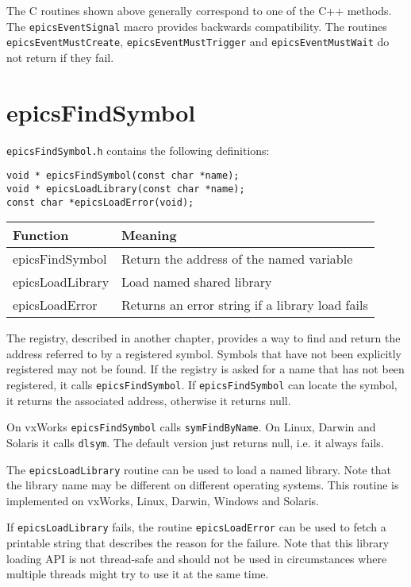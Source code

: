 The C routines shown above generally correspond to one of the C++ methods.
The \verb|epicsEventSignal| macro provides backwards compatibility.
The routines \verb|epicsEventMustCreate|, \verb|epicsEventMustTrigger| and \verb|epicsEventMustWait| do not return if they fail.

\section{epicsFindSymbol}

\verb|epicsFindSymbol.h| contains the following definitions:

\begin{verbatim}
void * epicsFindSymbol(const char *name);
void * epicsLoadLibrary(const char *name);
const char *epicsLoadError(void);
\end{verbatim}

\begin{center}
\begin{longtable}{p{1.35in}p{2.5in}}
\textbf{Function} & \textbf{Meaning}\\
\hline
epicsFindSymbol & Return the address of the named variable\\
epicsLoadLibrary & Load named shared library\\
epicsLoadError & Returns an error string if a library load fails
\end{longtable}
\end{center}

The registry, described in another chapter, provides a way to find and return the address referred to by a registered symbol.
Symbols that have not been explicitly registered may not be found.
If the registry is asked for a name that has not been registered, it calls \verb|epicsFindSymbol|.
If \verb|epicsFindSymbol| can locate the symbol, it returns the associated address, otherwise it returns null.

On vxWorks \verb|epicsFindSymbol| calls \verb|symFindByName|.
On Linux, Darwin and Solaris it calls \verb|dlsym|.
The default version just returns null, i.e. it always fails.

The \verb|epicsLoadLibrary| routine can be used to load a named library.
Note that the library name may be different on different operating systems.
This routine is implemented on vxWorks, Linux, Darwin, Windows and Solaris.

If \verb|epicsLoadLibrary| fails, the routine \verb|epicsLoadError| can be used to fetch a printable string that describes the reason for the failure.
Note that this library loading API is not thread-safe and should not be used in circumstances where multiple threads might try to use it at the same time.

